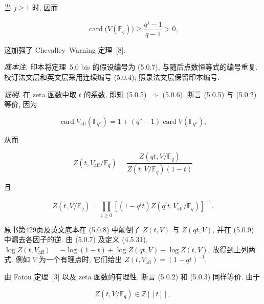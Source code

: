 当 $j\geq1$ 时, 因而

\begin{equation}\tag{5.0.6 bis}
\operatorname{card}\bigl(V(\mathbb F_q)\bigr)
\geq\frac{q^j-1}{q-1}>0,
\end{equation}

\noindent
这加强了 Chevalley--Warning 定理~[8].

\medskip
\noindent\emph{底本注.}
印本将定理~5.0 bis 的假设编号为 (5.0.7), 与随后点数恒等式的编号重复.
校订法文层和英文层采用连续编号 (5.0.4); 照录法文层保留印本编号.

\medskip
\noindent\emph{证明.}
在 zeta 函数中取 $t$ 的系数, 即知 (5.0.5) $\Rightarrow$ (5.0.6).
断言 (5.0.5) 与 (5.0.2) 等价, 因为

\begin{equation}\tag{5.0.7}
\operatorname{card}V_{\mathrm{aff}}(\mathbb F_{q^\nu})
=1+(q^\nu-1)\operatorname{card}V(\mathbb F_{q^\nu}),
\end{equation}

从而

\begin{equation}\tag{5.0.8}
Z(t,V_{\mathrm{aff}}/\mathbb F_q)
=\frac{Z(qt,V/\mathbb F_q)}
{Z(t,V/\mathbb F_q)(1-t)}
\end{equation}

且

\begin{equation}\tag{5.0.9}
Z(t,V/\mathbb F_q)
=\prod_{i\geq0}
\left[(1-q^it)Z(q^it,V_{\mathrm{aff}}/\mathbb F_q)\right]^{-1}.
\end{equation}

\begin{editorialnote}
原书第429页及英文底本在 (5.0.8) 中颠倒了 $Z(t,V)$ 与 $Z(qt,V)$, 并在 (5.0.9) 中漏去各因子的逆.
由 (5.0.7) 及定义 (4.5.31),
$\log Z(t,V_{\mathrm{aff}})=-\log(1-t)+\log Z(qt,V)-\log Z(t,V)$,
故得到上列两式. 例如 $V$ 为一个有理点时, 它们给出 $Z(t,V_{\mathrm{aff}})=(1-qt)^{-1}$.
\end{editorialnote}

\noindent
由 Fatou 定理~[3] 以及 zeta 函数的有理性, 断言 (5.0.2) 和 (5.0.3) 同样等价.
由于

\begin{equation}\tag{5.0.10}
Z(t,V/\mathbb F_q)\in\mathbb Z[[t]],
\end{equation}


